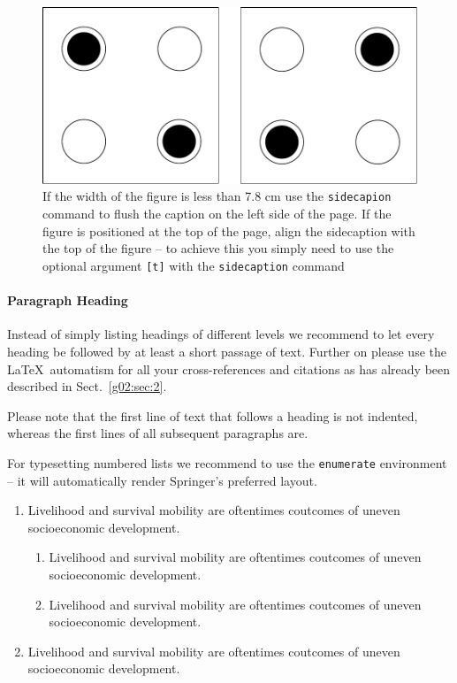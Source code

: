 %
\begin{figure}[b]
\sidecaption
\includegraphics[scale=.3]{qca_cells}
%
%
\caption{If the width of the figure is less than 7.8 cm use the \texttt{sidecapion} command to flush the caption on the left side of the page. If the figure is positioned at the top of the page, align the sidecaption with the top of the figure -- to achieve this you simply need to use the optional argument \texttt{[t]} with the \texttt{sidecaption} command}
\label{g02:fig:1}       %
\end{figure}


\paragraph{Paragraph Heading} %
Instead of simply listing headings of different levels we recommend to let every heading be followed by at least a short passage of text. Further on please use the \LaTeX\ automatism for all your cross-references and citations as has already been described in Sect.~\ref{g02:sec:2}.

Please note that the first line of text that follows a heading is not indented, whereas the first lines of all subsequent paragraphs are.

For typesetting numbered lists we recommend to use the \verb|enumerate| environment -- it will automatically render Springer's preferred layout.

\begin{enumerate}
\item{Livelihood and survival mobility are oftentimes coutcomes of uneven socioeconomic development.}
\begin{enumerate}
\item{Livelihood and survival mobility are oftentimes coutcomes of uneven socioeconomic development.}
\item{Livelihood and survival mobility are oftentimes coutcomes of uneven socioeconomic development.}
\end{enumerate}
\item{Livelihood and survival mobility are oftentimes coutcomes of uneven socioeconomic development.}
\end{enumerate}


